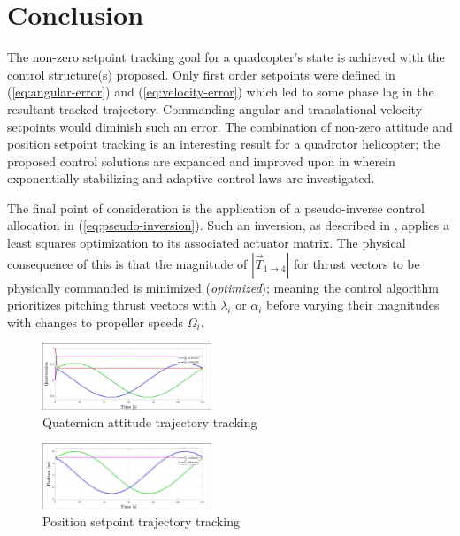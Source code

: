 \documentclass[a4paper, 10pt, conference]{ieeeconf}
\begin{document}
\section{Conclusion}
\label{sec:conclusion}
The non-zero setpoint tracking goal for a quadcopter's state is achieved with the control structure(s) proposed. Only first order setpoints were defined in (\ref{eq:angular-error}) and (\ref{eq:velocity-error}) which led to some phase lag in the resultant tracked trajectory. Commanding angular and translational velocity setpoints would diminish such an error. The combination of non-zero attitude and position setpoint tracking is an interesting result for a quadrotor helicopter; the proposed control solutions are expanded and improved upon in \cite{dualaxistilting} wherein exponentially stabilizing and adaptive control laws are investigated.
\par
The final point of consideration is the application of a pseudo-inverse control allocation in (\ref{eq:pseudo-inversion}). Such an inversion, as described in \cite{allocation}, applies a least squares optimization to its associated actuator matrix. The physical consequence of this is that the magnitude of $|\vec{T}_{1\rightarrow 4}|$ for thrust vectors to be physically commanded is minimized (\emph{optimized}); meaning the control algorithm prioritizes pitching thrust vectors with $\lambda_i$ or $\alpha_i$ before varying their magnitudes with changes to propeller speeds $\Omega_i$.
\begin{figure}[tbp]
\centering
\includegraphics[width=0.45\textwidth]{figs/attitude-trajectory}
\vspace{-10pt}
\caption{Quaternion attitude trajectory tracking}
\label{fig:attitude-trajectory}
\end{figure}
\begin{figure}
\vspace{-11pt}
\centering
\includegraphics[width=0.45\textwidth]{figs/position-trajectory}
\vspace{-10pt}
\caption{Position setpoint trajectory tracking}
\label{fig:position-trajectory}
\vspace{-20pt}
\end{figure}
\end{document}
